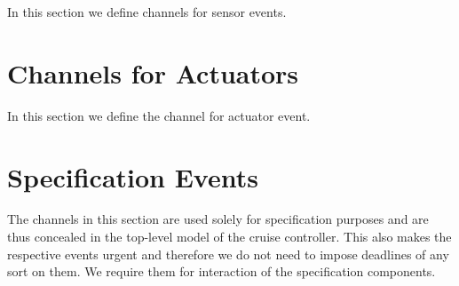 \documentclass{article}
\begin{document}
In this section we define channels for sensor events.
%


\newpage


\section{Channels for Actuators}

In this section we define the channel for actuator event.
%




%

\newpage


\section{Specification Events}

The channels in this section are used solely for specification purposes and are thus concealed in the top-level model of the cruise controller. This also makes the respective events urgent and therefore we do not need to impose deadlines of any sort on them. We require them for interaction of the specification components.
%


\newpage


%
\end{document}
